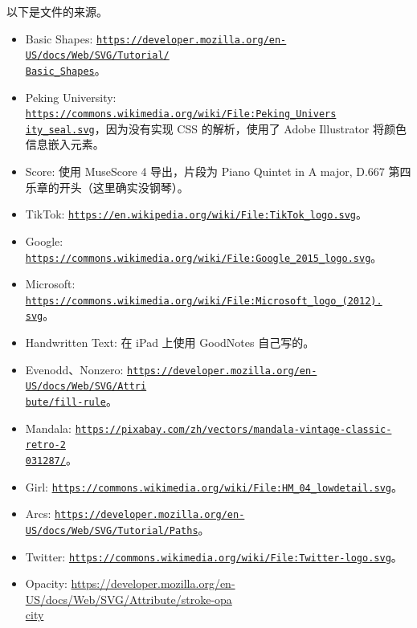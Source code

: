 \documentclass[UTF8]{ctexart}
\begin{document}
以下是文件的来源。
\begin{itemize}
    \item Basic Shapes: \href{https://developer.mozilla.org/en-US/docs/Web/SVG/Tutorial/Basic\_Shapes}{\texttt{https://developer.mozilla.org/en-US/docs/Web/SVG/Tutorial/\\Basic\_Shapes}}。
    \item Peking University: \href{https://commons.wikimedia.org/wiki/File:Peking_University_seal.svg}{\texttt{https://commons.wikimedia.org/wiki/File:Peking\_Univers\\ity\_seal.svg}}，因为没有实现 CSS 的解析，使用了 Adobe Illustrator 将颜色信息嵌入元素。
    \item Score: 使用 MuseScore 4 导出，片段为 Piano Quintet in A major, D.667 第四乐章的开头（这里确实没钢琴）。
    \item TikTok: \href{https://en.wikipedia.org/wiki/File:TikTok_logo.svg}{\texttt{https://en.wikipedia.org/wiki/File:TikTok\_logo.svg}}。
    \item Google: \href{https://commons.wikimedia.org/wiki/File:Google_2015_logo.svg}{\texttt{https://commons.wikimedia.org/wiki/File:Google\_2015\_logo.svg}}。
    \item Microsoft: \href{https://commons.wikimedia.org/wiki/File:Microsoft_logo_(2012).svg}{\texttt{https://commons.wikimedia.org/wiki/File:Microsoft\_logo\_(2012).\\svg}}。
    \item Handwritten Text: 在 iPad 上使用 GoodNotes 自己写的。
    \item Evenodd、Nonzero: \href{https://developer.mozilla.org/en-US/docs/Web/SVG/Attribute/fill-rule}{\texttt{https://developer.mozilla.org/en-US/docs/Web/SVG/Attri\\bute/fill-rule}}。
    \item Mandala: \href{https://pixabay.com/zh/vectors/mandala-vintage-classic-retro-2031287/}{\texttt{https://pixabay.com/zh/vectors/mandala-vintage-classic-retro-2\\031287/}}。
    \item Girl: \href{https://commons.wikimedia.org/wiki/File:HM_04_lowdetail.svg}{\texttt{https://commons.wikimedia.org/wiki/File:HM\_04\_lowdetail.svg}}。
    \item Arcs: \href{https://developer.mozilla.org/en-US/docs/Web/SVG/Tutorial/Paths}{\texttt{https://developer.mozilla.org/en-US/docs/Web/SVG/Tutorial/Paths}}。
    \item Twitter: \href{https://commons.wikimedia.org/wiki/File:Twitter-logo.svg}{\texttt{https://commons.wikimedia.org/wiki/File:Twitter-logo.svg}}。
    \item Opacity: \href{https://developer.mozilla.org/en-US/docs/Web/SVG/Attribute/stroke-opacity}{https://developer.mozilla.org/en-US/docs/Web/SVG/Attribute/stroke-opa\\city}
\end{itemize}
\end{document}
